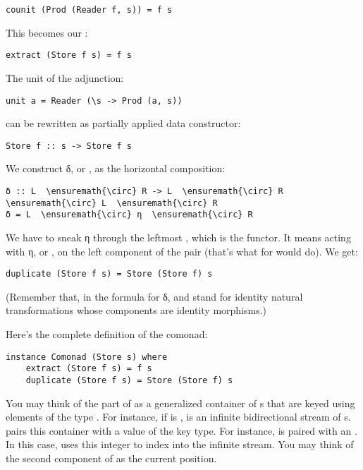 \begin{Verbatim}[commandchars=\\\{\}]
counit (Prod (Reader f, s)) = f s
\end{Verbatim}
This becomes our :

\begin{Verbatim}[commandchars=\\\{\}]
extract (Store f s) = f s
\end{Verbatim}
The unit of the adjunction:

\begin{Verbatim}
unit a = Reader (\s -> Prod (a, s))
\end{Verbatim}
can be rewritten as partially applied data constructor:

\begin{Verbatim}[commandchars=\\\{\}]
Store f :: s -> Store f s
\end{Verbatim}
We construct δ, or , as the horizontal composition:

\begin{Verbatim}[commandchars=\\\{\}]
δ :: L  \ensuremath{\circ} R -> L  \ensuremath{\circ} R  \ensuremath{\circ} L  \ensuremath{\circ} R
δ = L  \ensuremath{\circ} η  \ensuremath{\circ} R
\end{Verbatim}
We have to sneak η through the leftmost , which is the
 functor. It means acting with η, or , on
the left component of the pair (that's what  for
 would do). We get:

\begin{Verbatim}[commandchars=\\\{\}]
duplicate (Store f s) = Store (Store f) s
\end{Verbatim}
(Remember that, in the formula for δ,  and  stand
for identity natural transformations whose components are identity
morphisms.)

Here's the complete definition of the  comonad:

\begin{Verbatim}[commandchars=\\\{\}]
instance Comonad (Store s) where
    extract (Store f s) = f s
    duplicate (Store f s) = Store (Store f) s
\end{Verbatim}
You may think of the  part of  as a
generalized container of s that are keyed using elements of
the type . For instance, if  is ,
 is an infinite bidirectional stream of
s.  pairs this container with a value of the key
type. For instance,  is paired with an
. In this case,  uses this integer to index
into the infinite stream. You may think of the second component of
 as the current position.

